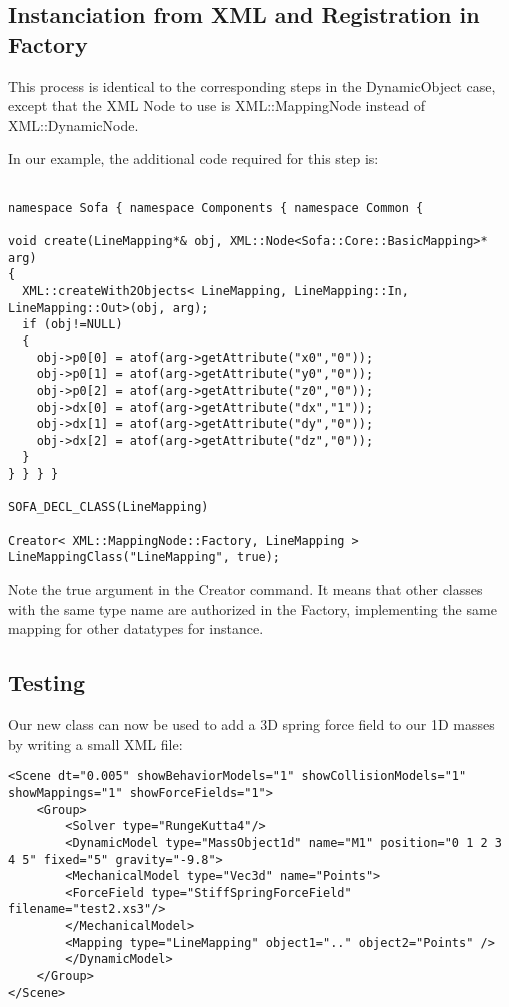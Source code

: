 \subsection{Instanciation from XML and Registration in Factory}

This process is identical to the corresponding steps in the DynamicObject case, except that the XML Node to use is XML::MappingNode instead of XML::DynamicNode.

In our example, the additional code required for this step is:
\begin{verbatim}

namespace Sofa { namespace Components { namespace Common {

void create(LineMapping*& obj, XML::Node<Sofa::Core::BasicMapping>* arg)
{
  XML::createWith2Objects< LineMapping, LineMapping::In, LineMapping::Out>(obj, arg);
  if (obj!=NULL)
  {
    obj->p0[0] = atof(arg->getAttribute("x0","0"));
    obj->p0[1] = atof(arg->getAttribute("y0","0"));
    obj->p0[2] = atof(arg->getAttribute("z0","0"));
    obj->dx[0] = atof(arg->getAttribute("dx","1"));
    obj->dx[1] = atof(arg->getAttribute("dy","0"));
    obj->dx[2] = atof(arg->getAttribute("dz","0"));
  }
} } } }

SOFA_DECL_CLASS(LineMapping)

Creator< XML::MappingNode::Factory, LineMapping > LineMappingClass("LineMapping", true);
\end{verbatim}

Note the true argument in the Creator command. It means that other classes with the same type name are authorized in the Factory, implementing the same mapping for other datatypes for instance.

\subsection{Testing}

Our new class can now be used to add a 3D spring force field to our 1D masses by writing a small XML file:

\begin{verbatim}
<Scene dt="0.005" showBehaviorModels="1" showCollisionModels="1" showMappings="1" showForceFields="1">
	<Group>
		<Solver type="RungeKutta4"/>
		<DynamicModel type="MassObject1d" name="M1" position="0 1 2 3 4 5" fixed="5" gravity="-9.8">
		<MechanicalModel type="Vec3d" name="Points">
		<ForceField type="StiffSpringForceField" filename="test2.xs3"/>
		</MechanicalModel>
		<Mapping type="LineMapping" object1=".." object2="Points" />
		</DynamicModel>
	</Group>
</Scene>
\end{verbatim}

